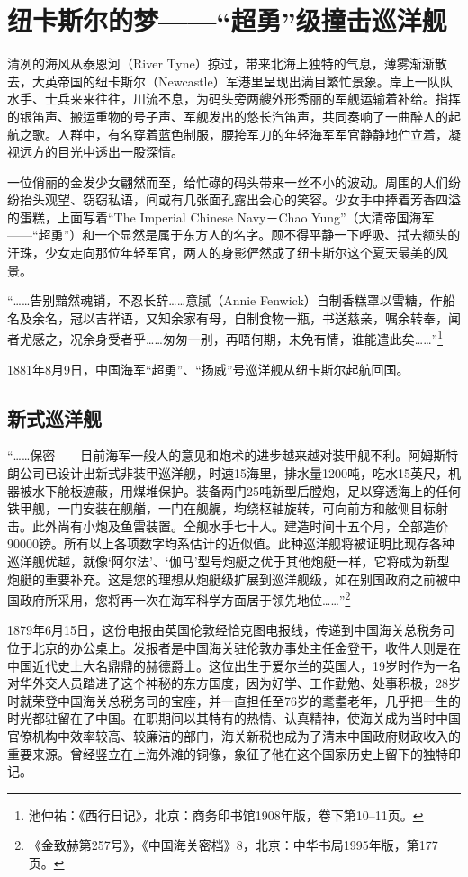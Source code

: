 \documentclass[12pt,UTF8]{ctexbook}
\begin{document}
\chapter{纽卡斯尔的梦——“超勇”级撞击巡洋舰}

清冽的海风从泰恩河（River Tyne）掠过，带来北海上独特的气息，薄雾渐渐散去，大英帝国的纽卡斯尔（Newcastle）军港里呈现出满目繁忙景象。岸上一队队水手、士兵来来往往，川流不息，为码头旁两艘外形秀丽的军舰运输着补给。指挥的银笛声、搬运重物的号子声、军舰发出的悠长汽笛声，共同奏响了一曲醉人的起航之歌。人群中，有名穿着蓝色制服，腰挎军刀的年轻海军军官静静地伫立着，凝视远方的目光中透出一股深情。

一位俏丽的金发少女翩然而至，给忙碌的码头带来一丝不小的波动。周围的人们纷纷抬头观望、窃窃私语，间或有几张面孔露出会心的笑容。少女手中捧着芳香四溢的蛋糕，上面写着“The Imperial Chinese Navy－Chao Yung”（大清帝国海军——“超勇”）和一个显然是属于东方人的名字。顾不得平静一下呼吸、拭去额头的汗珠，少女走向那位年轻军官，两人的身影俨然成了纽卡斯尔这个夏天最美的风景。

“……告别黯然魂销，不忍长辞……意腻（Annie Fenwick）自制香糕罩以雪糖，作船名及余名，冠以吉祥语，又知余家有母，自制食物一瓶，书送慈亲，嘱余转奉，闻者尤感之，况余身受者乎……匆匆一别，再晤何期，未免有情，谁能遣此矣……”\footnote{池仲祐：《西行日记》，北京：商务印书馆1908年版，卷下第10--11页。}

1881年8月9日，中国海军“超勇”、“扬威”号巡洋舰从纽卡斯尔起航回国。

\section{新式巡洋舰}

“……保密——目前海军一般人的意见和炮术的进步越来越对装甲舰不利。阿姆斯特朗公司已设计出新式非装甲巡洋舰，时速15海里，排水量1200吨，吃水15英尺，机器被水下舱板遮蔽，用煤堆保护。装备两门25吨新型后膛炮，足以穿透海上的任何铁甲舰，一门安装在舰艏，一门在舰艉，均绕枢轴旋转，可向前方和舷侧目标射击。此外尚有小炮及鱼雷装置。全舰水手七十人。建造时间十五个月，全部造价90000镑。所有以上各项数字均系估计的近似值。此种巡洋舰将被证明比现存各种巡洋舰优越，就像‘阿尔法’、‘伽马’型号炮艇之优于其他炮艇一样，它将成为新型炮艇的重要补充。这是您的理想从炮艇级扩展到巡洋舰级，如在别国政府之前被中国政府所采用，您将再一次在海军科学方面居于领先地位……”\footnote{《金致赫第257号》，《中国海关密档》8，北京：中华书局1995年版，第177页。}

1879年6月15日，这份电报由英国伦敦经恰克图电报线，传递到中国海关总税务司位于北京的办公桌上。发报者是中国海关驻伦敦办事处主任金登干，收件人则是在中国近代史上大名鼎鼎的赫德爵士。这位出生于爱尔兰的英国人，19岁时作为一名对华外交人员踏进了这个神秘的东方国度，因为好学、工作勤勉、处事积极，28岁时就荣登中国海关总税务司的宝座，并一直担任至76岁的耄耋老年，几乎把一生的时光都驻留在了中国。在职期间以其特有的热情、认真精神，使海关成为当时中国官僚机构中效率较高、较廉洁的部门，海关新税也成为了清末中国政府财政收入的重要来源。曾经竖立在上海外滩的铜像，象征了他在这个国家历史上留下的独特印记。
\end{document}
